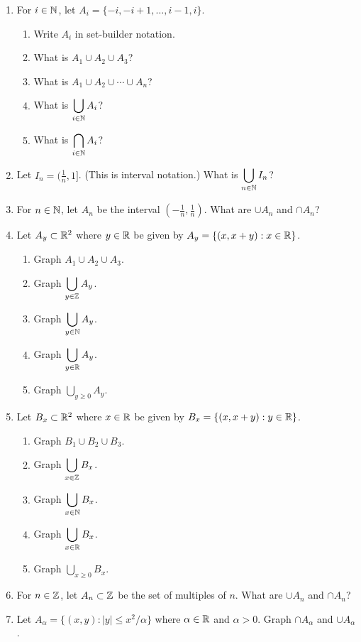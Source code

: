 \probsec{~\ref{sec:indexed-sets}}
\begin{enumerate}
    \item For $i \in \mathbb{N}$, let $A_i = \{-i, -i+1, \dots, i-1, i\}$.
  \begin{enumerate}
      \item Write $A_i$ in set-builder notation.
      \item What is $A_1 \cup A_2 \cup A_3$?
      \item What is $A_1 \cup A_2 \cup \cdots \cup A_{n}$?
      \item What is $\displaystyle\bigcup_{i \in \mathbb{N}} A_i$?
      \item What is $\displaystyle\bigcap_{i\in\mathbb{N}} A_i$?
  \end{enumerate}

    \item Let $I_n = (\frac{1}{n}, 1]$. (This is interval notation.) What is $\displaystyle\bigcup_{n \in \mathbb{N}} I_n$?

    \item For $n \in \mathbb{N}$, let $A_n$ be the interval $(-\frac{1}{n}, \frac{1}{n})$. What are $\cup A_n$ and $\cap A_n$?

    \item Let $A_y \subset \mathbb{R}^2$ where $y \in \mathbb{R}$ be given by $A_y = \{(x, x+y): x \in \mathbb{R}\}$.
  \begin{enumerate}
      \item Graph $A_1 \cup A_2 \cup A_3$.
      \item Graph $\displaystyle\bigcup_{y \in \mathbb{Z}} A_y$.
      \item Graph $\displaystyle\bigcup_{y \in \mathbb{N}} A_y$.
      \item Graph $\displaystyle\bigcup_{y \in \mathbb{R}} A_y$.
      \item Graph $\displaystyle\bigcup_{y \geq 0} A_y$.
  \end{enumerate}

    \item Let $B_x \subset \mathbb{R}^2$ where $x \in \mathbb{R}$ be given by $B_x = \{(x, x+y): y \in \mathbb{R}\}$.
  \begin{enumerate}
      \item Graph $B_1 \cup B_2 \cup B_3$.
      \item Graph $\displaystyle\bigcup_{x \in \mathbb{Z}} B_x$.
      \item Graph $\displaystyle\bigcup_{x\in \mathbb{N}} B_x$.
      \item Graph $\displaystyle\bigcup_{x \in \mathbb{R}} B_x$.
      \item Graph $\displaystyle\bigcup_{x \geq 0} B_x$.
  \end{enumerate}

    \item For $n \in \mathbb{Z}$, let $A_n \subset \mathbb{Z}$ be the set of multiples of $n$. What are $\cup A_n$ and $\cap A_n$?

    \item Let $A_\alpha = \{(x,y): |y| \leq x^2/\alpha\}$ where $\alpha \in \mathbb{R}$ and $\alpha > 0$. Graph $\cap A_\alpha$ and $\cup A_\alpha$.
\end{enumerate}
